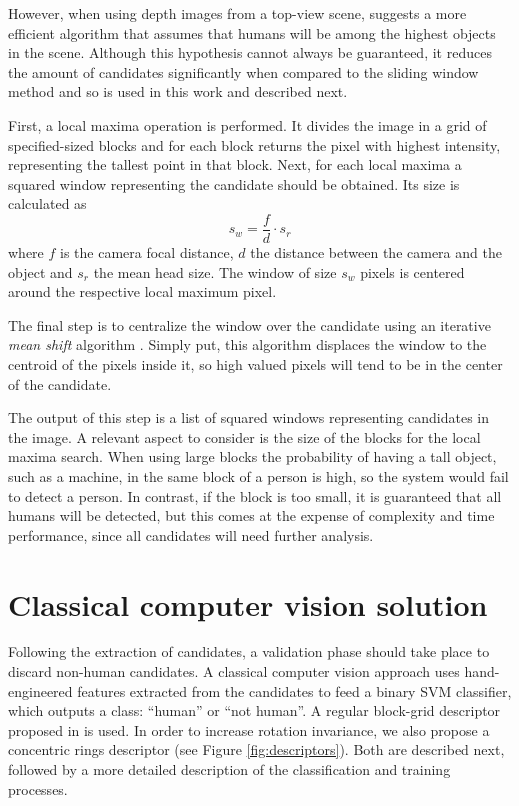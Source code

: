     However, when using depth images from a top-view scene, \cite{rauter} suggests a more efficient algorithm that assumes that humans will be among the highest objects in the scene. Although this hypothesis cannot always be guaranteed, it reduces the amount of candidates significantly when compared to the sliding window method and so is used in this work and described next.

    First, a local maxima operation is performed. It divides the image in a grid of specified-sized blocks and for each block returns the pixel with highest intensity, representing the tallest point in that block. Next, for each local maxima a squared window representing the candidate should be obtained. Its size is calculated as
    \begin{equation}
      s_w = \frac{f}{d} \cdot s_r
    \end{equation}
    where $f$ is the camera focal distance, $d$ the distance between the camera and the object and $s_r$ the mean head size. The window of size $s_w$ pixels is centered around the respective local maximum pixel.

    The final step is to centralize the window over the candidate using an iterative \textit{mean shift} algorithm \cite{meanshift}. Simply put, this algorithm displaces the window to the centroid of the pixels inside it, so high valued pixels will tend to be in the center of the candidate.

    The output of this step is a list of squared windows representing candidates in the image. A relevant aspect to consider is the size of the blocks for the local maxima search. When using large blocks the probability of having a tall object, such as a machine, in the same block of a person is high, so the system would fail to detect a person. In contrast, if the block is too small, it is guaranteed that all humans will be detected, but this comes at the expense of complexity and time performance, since all candidates will need further analysis.

\section{Classical computer vision solution}
\label{sec:classical}

    Following the extraction of candidates, a validation phase should take place to discard non-human candidates. A classical computer vision approach \cite{rauter} uses hand-engineered features extracted from the candidates to feed a binary SVM classifier, which outputs a class: ``human'' or ``not human''. A regular block-grid descriptor proposed in \cite{rauter} is used. In order to increase rotation invariance, we also propose a concentric rings descriptor (see Figure \ref{fig:descriptors}). Both are described next, followed by a more detailed description of the classification and training processes.

